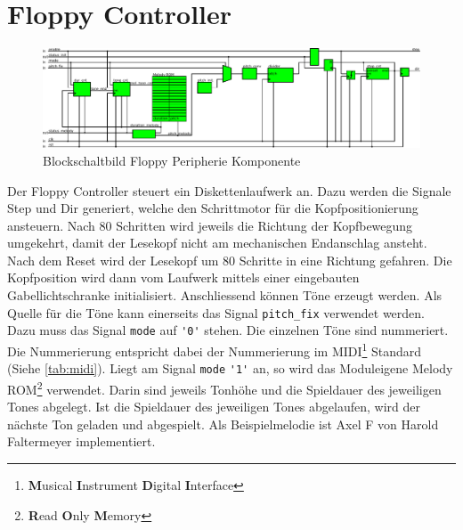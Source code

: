 \section{Floppy Controller}
\begin{figure}[h!]
    \centering
    \includegraphics[width=1.0\textwidth]{../organization/floppy_controller.pdf}
    \caption{Blockschaltbild Floppy Peripherie Komponente}
    \label{fig:block}
\end{figure}
\noindent Der Floppy Controller steuert ein Diskettenlaufwerk an. Dazu werden die 
Signale Step und Dir generiert, welche den Schrittmotor für die 
Kopfpositionierung ansteuern. Nach 80 Schritten wird jeweils die Richtung der 
Kopfbewegung umgekehrt, damit der Lesekopf nicht am mechanischen Endanschlag 
ansteht. Nach dem Reset wird der Lesekopf um 80 Schritte in eine Richtung 
gefahren. Die Kopfposition wird dann vom Laufwerk mittels einer eingebauten 
Gabellichtschranke initialisiert. Anschliessend können Töne erzeugt werden. 
Als Quelle für die Töne kann einerseits das Signal \verb!pitch_fix! verwendet 
werden. Dazu muss das Signal \verb!mode! auf \verb!'0'! stehen. Die einzelnen 
Töne sind nummeriert. Die Nummerierung entspricht dabei der Nummerierung im 
MIDI\footnote{\textbf{M}usical \textbf{I}nstrument \textbf{D}igital 
\textbf{I}nterface} Standard (Siehe \autoref{tab:midi}). Liegt am Signal 
\verb!mode! \verb!'1'! an, so wird das Moduleigene Melody 
ROM\footnote{\textbf{R}ead \textbf{O}nly \textbf{M}emory} verwendet. Darin 
sind jeweils Tonhöhe und die Spieldauer des jeweiligen Tones abgelegt. Ist die 
Spieldauer des jeweiligen Tones abgelaufen, wird der nächste Ton geladen und 
abgespielt. Als Beispielmelodie ist Axel F von Harold Faltermeyer 
implementiert. 

